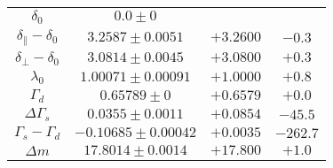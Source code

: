 \documentclass[aspectratio=43,9pt]{beamer}
\begin{document}
\begin{frame}
\begin{tabular}{cccc}
    $                      \delta_0 $&$                 0.0 \pm 0 $\\
    $ \delta_{\parallel} - \delta_0 $&$         3.2587 \pm 0.0051 $&$ +3.2600 $&$ -0.3 $\\
    $     \delta_{\perp} - \delta_0 $&$         3.0814 \pm 0.0045 $&$ +3.0800 $&$ +0.3 $\\
    $                     \lambda_0 $&$       1.00071 \pm 0.00091 $&$ +1.0000 $&$ +0.8 $\\
    $                      \Gamma_d $&$             0.65789 \pm 0 $&$ +0.6579 $&$ +0.0 $\\
    $                \Delta\Gamma_s $&$         0.0355 \pm 0.0011 $&$ +0.0854 $&$ -45.5 $\\
    $           \Gamma_s - \Gamma_d $&$      -0.10685 \pm 0.00042 $&$ +0.0035 $&$ -262.7 $\\
    $                      \Delta m $&$        17.8014 \pm 0.0014 $&$ +17.800 $&$ +1.0 $\\
  \hline
  \end{tabular}
  
\end{frame}

\end{document}
